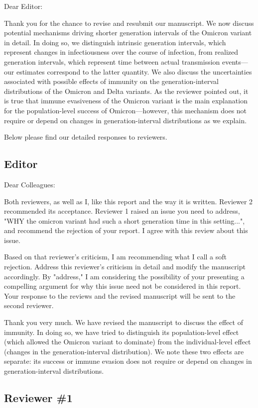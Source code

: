 \documentclass[12pt]{article}
\newcommand{\rev}{\subsection*}
\newcommand{\revtext}{\textsf}
\begin{document}
\noindent Dear Editor:

Thank you for the chance to revise and resubmit our manuscript. 
We now discuss potential mechanisms driving shorter generation intervals of the Omicron variant in detail.
In doing so, we distinguish intrinsic generation intervals, which represent changes in infectiousness over the course of infection, from realized generation intervals, which represent time between actual transmission events---our estimates correspond to the latter quantity.
We also discuss the uncertainties associated with possible effects of immunity on the generation-interval distributions of the Omicron and Delta variants.
As the reviewer pointed out, it is true that immune evasiveness of the Omicron variant is the main explanation for the population-level success of Omicron---however, this mechanism does not require or depend on changes in generation-interval distributions as we explain. 

Below please find our detailed responses to reviewers.

\rev{Editor}

\revtext{Dear Colleagues:}

\revtext{Both reviewers, as well as I, like this report and the way it is written. Reviewer 2 recommended its acceptance. Reviewer 1 raised an issue you need to address, "WHY the omicron variant had such a short generation time in this setting...", and 
recommend the rejection of your report. I agree with this review about this issue.}

\revtext{Based on that reviewer's criticism, I am recommending what I call a soft rejection. Address this reviewer's criticism in detail and modify the manuscript accordingly. By "address," I am considering the possibility of your presenting a compelling argument for why this issue need not be considered in this report. Your response to the reviews and the revised manuscript will be sent to the second reviewer.}

Thank you very much. We have revised the manuscript to discuss the effect of immunity. In doing so, we have tried to distinguish its population-level effect (which allowed the Omicron variant to dominate) from the individual-level effect (changes in the generation-interval distribution).
We note these two effects are separate: its success or immune evasion does not require or depend on changes in generation-interval distributions.

\rev{Reviewer \#1}
\end{document}
